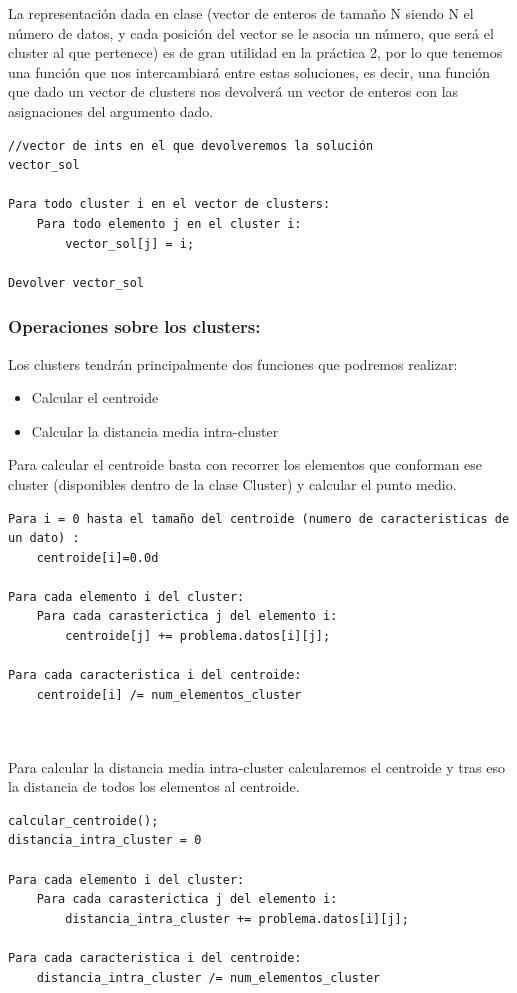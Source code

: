 \documentclass[12pt, spanish]{article}
\begin{document}
La representación dada en clase (vector de enteros de tamaño N siendo N el número de datos, y cada posición del vector se le asocia un número, que será el cluster al que pertenece) es de gran utilidad en la práctica 2, por lo que tenemos una función que nos intercambiará entre estas soluciones, es decir, una función que dado un vector de clusters nos devolverá un vector de enteros con las asignaciones del argumento dado.

\begin{lstlisting}
//vector de ints en el que devolveremos la solución
vector_sol 

Para todo cluster i en el vector de clusters:
	Para todo elemento j en el cluster i:
		vector_sol[j] = i;
		
Devolver vector_sol

\end{lstlisting}


\subsubsection{Operaciones sobre los clusters:}

Los clusters tendrán principalmente dos funciones que podremos realizar:

\begin{itemize}
	\item {Calcular el centroide}
	\item {Calcular la distancia media intra-cluster}
\end{itemize}

Para calcular el centroide basta con recorrer los elementos que conforman ese cluster (disponibles dentro de la clase Cluster) y calcular el punto medio.

\begin{lstlisting}
Para i = 0 hasta el tamaño del centroide (numero de caracteristicas de un dato) :
	centroide[i]=0.0d
	
Para cada elemento i del cluster:
	Para cada carasterictica j del elemento i:
		centroide[j] += problema.datos[i][j];
		
Para cada caracteristica i del centroide:
	centroide[i] /= num_elementos_cluster 
	
	
\end{lstlisting}

Para calcular la distancia media intra-cluster calcularemos el centroide y tras eso la distancia de todos los elementos al centroide.


\begin{lstlisting}
calcular_centroide();
distancia_intra_cluster = 0
	
Para cada elemento i del cluster:
	Para cada carasterictica j del elemento i:
		distancia_intra_cluster += problema.datos[i][j];
		
Para cada caracteristica i del centroide:
	distancia_intra_cluster /= num_elementos_cluster 
	
	
\end{lstlisting}
\end{document}
